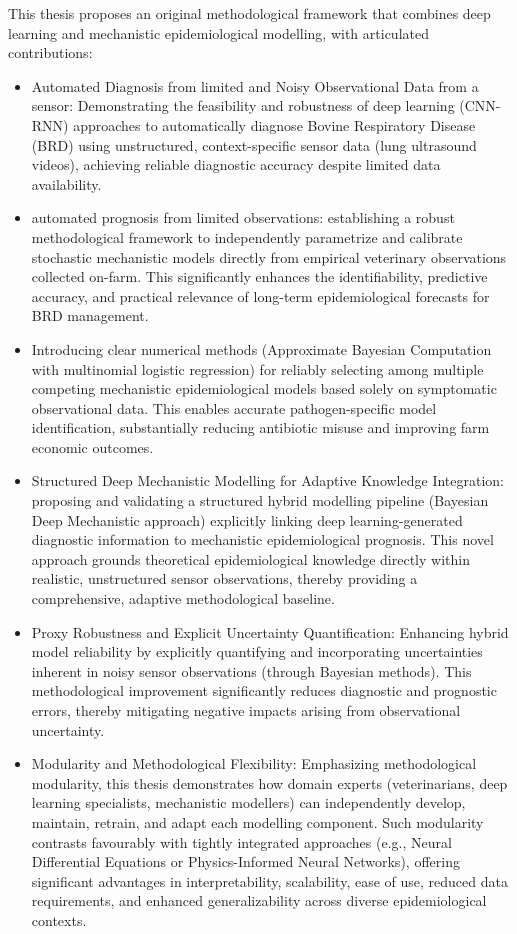 This thesis proposes an original methodological framework that combines deep learning and mechanistic epidemiological modelling, with articulated contributions:
\begin{itemize}
    \item Automated Diagnosis from limited and Noisy Observational Data from a sensor: Demonstrating the feasibility and robustness of deep learning (CNN-RNN) approaches to automatically diagnose Bovine Respiratory Disease (BRD) using unstructured, context-specific sensor data (lung ultrasound videos), achieving reliable diagnostic accuracy despite limited data availability.
    \item automated prognosis from limited observations: establishing a robust methodological framework to independently parametrize and calibrate stochastic mechanistic models directly from empirical veterinary observations collected on-farm. This significantly enhances the identifiability, predictive accuracy, and practical relevance of long-term epidemiological forecasts for BRD management.
    \item Introducing clear numerical methods (Approximate Bayesian Computation with multinomial logistic regression) for reliably selecting among multiple competing mechanistic epidemiological models based solely on symptomatic observational data. This enables accurate pathogen-specific model identification, substantially reducing antibiotic misuse and improving farm economic outcomes.
    \item Structured Deep Mechanistic Modelling for Adaptive Knowledge Integration: proposing and validating a structured hybrid modelling pipeline (Bayesian Deep Mechanistic approach) explicitly linking deep learning-generated diagnostic information to mechanistic epidemiological prognosis. This novel approach grounds theoretical epidemiological knowledge directly within realistic, unstructured sensor observations, thereby providing a comprehensive, adaptive methodological baseline.
    \item Proxy Robustness and Explicit Uncertainty Quantification: Enhancing hybrid model reliability by explicitly quantifying and incorporating uncertainties inherent in noisy sensor observations (through Bayesian methods). This methodological improvement significantly reduces diagnostic and prognostic errors, thereby mitigating negative impacts arising from observational uncertainty.
    \item Modularity and Methodological Flexibility: Emphasizing methodological modularity, this thesis demonstrates how domain experts (veterinarians, deep learning specialists, mechanistic modellers) can independently develop, maintain, retrain, and adapt each modelling component. Such modularity contrasts favourably with tightly integrated approaches (e.g., Neural Differential Equations or Physics-Informed Neural Networks), offering significant advantages in interpretability, scalability, ease of use, reduced data requirements, and enhanced generalizability across diverse epidemiological contexts.
\end{itemize}


